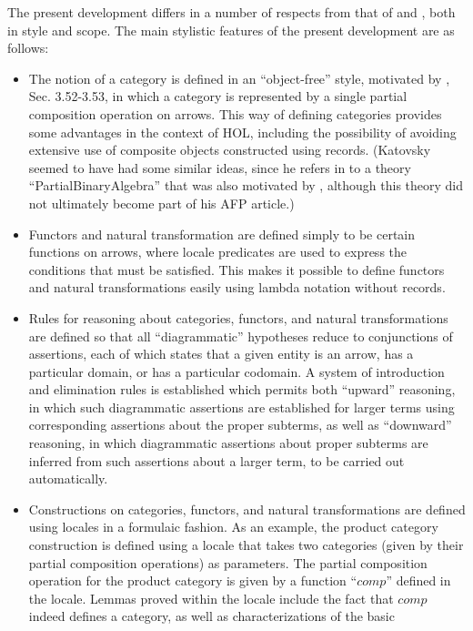 \documentclass[11pt,notitlepage,a4paper]{report}
\begin{document}
The present development differs in a number of respects from that of
\cite{OKeefe-AFP05} and \cite{Katovsky-AFP10}, both in style and scope.
The main stylistic features of the present development are as follows:
\begin{itemize}
\item  The notion of a category is defined in an ``object-free'' style,
  motivated by \cite{AHS}, Sec. 3.52-3.53, in which a category is represented by a
  single partial composition operation on arrows.
  This way of defining categories provides some advantages in the context of HOL,
  including the possibility of avoiding extensive use of composite objects constructed
  using records.
  (Katovsky seemed to have had some similar ideas, since he refers in
  \cite{Katovsky-CatThy10} to a theory ``PartialBinaryAlgebra'' that was also motivated
  by \cite{AHS}, although this theory did not ultimately become part of his AFP article.)
\item  Functors and natural transformation are defined simply to be certain
  functions on arrows, where locale predicates are used to express the conditions
  that must be satisfied.  This makes it possible to define functors and natural
  transformations easily using lambda notation without records.
\item  Rules for reasoning about categories, functors, and natural transformations
  are defined so that all ``diagrammatic'' hypotheses reduce to conjunctions of
  assertions, each of which states that a given entity is an arrow, has a particular
  domain, or has a particular codomain.  A system of introduction and elimination rules
  is established which permits both ``upward'' reasoning, in which such diagrammatic
  assertions are established for larger terms using corresponding assertions about
  the proper subterms, as well as ``downward'' reasoning, in which diagrammatic
  assertions about proper subterms are inferred from such assertions about a larger
  term, to be carried out automatically.
\item  Constructions on categories, functors, and natural transformations are defined
  using locales in a formulaic fashion.
  As an example, the product category construction is defined using a locale that
  takes two categories (given by their partial composition operations) as parameters.
  The partial composition operation for the product category is given by a function
  ``$comp$'' defined in the locale.  Lemmas proved within the locale include the fact
  that $comp$ indeed defines a category, as well as characterizations of the basic

\end{itemize}
\end{document}
